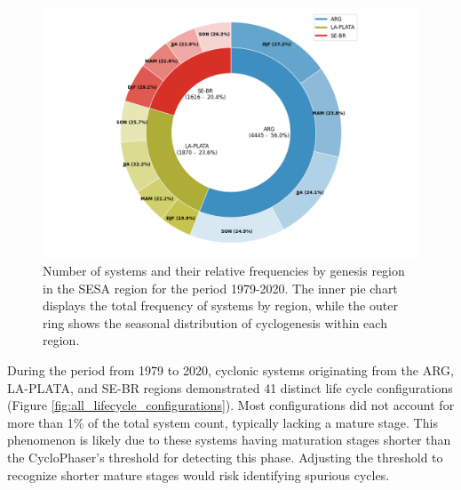 \begin{figure}[ht]
    \centering
    \includegraphics[width=\textwidth]{figs_4/pie_systems_count.png}
    \caption[Cyclogenesis Climatology in the SESA Region]{Number of systems and their relative frequencies by genesis region in the SESA region for the period 1979-2020. The inner pie chart displays the total frequency of systems by region, while the outer ring shows the seasonal distribution of cyclogenesis within each region.}
\label{fig:pie_climatology}
\end{figure}


During the period from 1979 to 2020, cyclonic systems originating from the ARG, LA-PLATA, and SE-BR regions demonstrated 41 distinct life cycle configurations (Figure \ref{fig:all_lifecycle_configurations}). Most configurations did not account for more than 1\% of the total system count, typically lacking a mature stage. This phenomenon is likely due to these systems having maturation stages shorter than the CycloPhaser's threshold for detecting this phase. Adjusting the threshold to recognize shorter mature stages would risk identifying spurious cycles.


